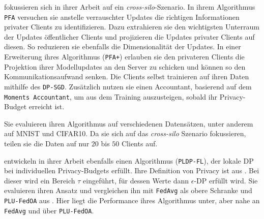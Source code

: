 \textcite{liu:2021} fokussieren sich in ihrer Arbeit auf ein \textit{cross-silo}-Szenario. In ihrem Algorithmus \texttt{PFA} versuchen sie anstelle verrauschter Updates die \glqq{}richtigen\grqq{} Informationen privater Clients zu identifizieren. Dazu extrahieren sie den wichtigsten Unterraum der Updates öffentlicher Clients und projizieren die Updates privater Clients auf diesen. So reduzieren sie ebenfalls die Dimensionalität der Updates. In einer Erweiterung ihres Algorithmus (\texttt{PFA+}) erlauben sie den privateren Clients die Projektion ihrer Modellupdates an den Server zu schicken und können so den Kommunikationsaufwand senken. Die Clients selbst trainieren auf ihren Daten mithilfe des \texttt{DP-SGD}\cite{abadi:2016}. Zusätzlich nutzen sie einen Accountant, basierend auf dem \texttt{Moments Accountant}, um aus dem Training auszusteigen, sobald ihr Privacy-Budget erreicht ist.

Sie evaluieren ihren Algorithmus auf verschiedenen Datensätzen, unter anderem auf MNIST und CIFAR10. Da sie sich auf das \textit{cross-silo} Szenario fokussieren, teilen sie die Daten auf nur $20$ bis $50$ Clients auf.

\textcite{shen:2023} entwickeln in ihrer Arbeit ebenfalls einen Algorithmus (\texttt{PLDP-FL}), der lokale DP bei individuellen Privacy-Budgets erfüllt. Ihre Definition von Privacy ist aus \textcite{chen:2016}. Bei dieser wird ein Bereich $\tau$ eingeführt, für dessen Werte dann $\epsilon$-DP erfüllt wird. Sie evaluieren ihren Ansatz und vergleichen ihn mit \texttt{FedAvg} \parencite{mcmahan:2016} als obere Schranke und \texttt{PLU-FedOA} aus \textcite{yang:2021}. Hier liegt die Performance ihres Algorithmus unter, aber nahe an \texttt{FedAvg} und über \texttt{PLU-FedOA}. 